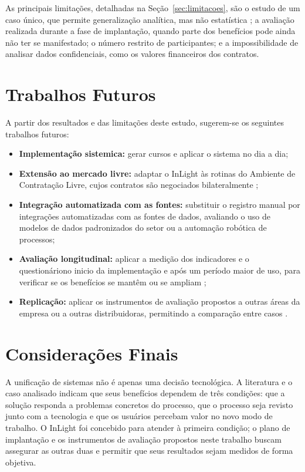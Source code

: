 As principais limitações, detalhadas na Seção~\ref{sec:limitacoes}, são o estudo de um caso único, que permite generalização analítica, mas não estatística \citep{yin2015}; a avaliação realizada durante a fase de implantação, quando parte dos benefícios pode ainda não ter se manifestado; o número restrito de participantes; e a impossibilidade de analisar dados confidenciais, como os valores financeiros dos contratos.

\section{Trabalhos Futuros}

A partir dos resultados e das limitações deste estudo, sugerem-se os seguintes trabalhos futuros:

\begin{itemize}
    \item \textbf{Implementação sistemica:} gerar cursos e aplicar o sistema no dia a dia;
    \item \textbf{Extensão ao mercado livre:} adaptar o InLight às rotinas do Ambiente de Contratação Livre, cujos contratos são negociados bilateralmente \citep{brasil2004decreto};
    \item \textbf{Integração automatizada com as fontes:} substituir o registro manual por integrações automatizadas com as fontes de dados, avaliando o uso de modelos de dados padronizados do setor ou a automação robótica de processos;
    \item \textbf{Avaliação longitudinal:} aplicar a medição dos indicadores e o questionáriono inicio da implementação e após um período maior de uso, para verificar se os benefícios se mantêm ou se ampliam \citep{tong2015};
    \item \textbf{Replicação:} aplicar os instrumentos de avaliação propostos a outras áreas da empresa ou a outras distribuidoras, permitindo a comparação entre casos \citep{yin2015}.
\end{itemize}

\section{Considerações Finais}

A unificação de sistemas não é apenas uma decisão tecnológica. A literatura e o caso analisado indicam que seus benefícios dependem de três condições: que a solução responda a problemas concretos do processo, que o processo seja revisto junto com a tecnologia e que os usuários percebam valor no novo modo de trabalho. O InLight foi concebido para atender à primeira condição; o plano de implantação e os instrumentos de avaliação propostos neste trabalho buscam assegurar as outras duas e permitir que seus resultados sejam medidos de forma objetiva.
